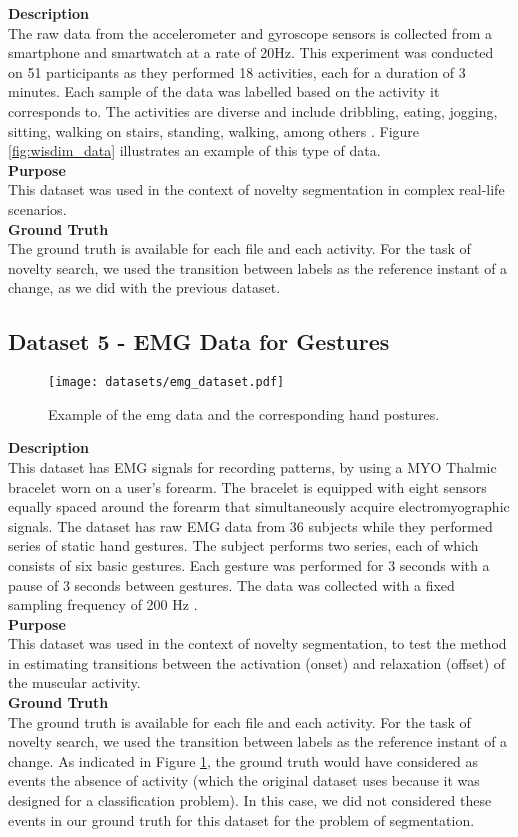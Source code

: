 \textbf{Description}\hfill\\
The raw data from the accelerometer and gyroscope sensors is collected from a smartphone and smartwatch at a rate of 20Hz. This experiment was conducted on 51 participants as they performed 18 activities, each for a duration of 3 minutes. Each sample of the data was labelled based on the activity it corresponds to. The activities are diverse and include dribbling, eating, jogging, sitting, walking on stairs, standing, walking, among others \cite{dataset4}. Figure \ref{fig:wisdim_data} illustrates an example of this type of data.\\
\textbf{Purpose}\hfill\\
This dataset was used in the context of novelty segmentation in complex real-life scenarios.\\
\textbf{Ground Truth}\\
The ground truth is available for each file and each activity. For the task of novelty search, we used the transition between labels as the reference instant of a change, as we did with the previous dataset.

\subsection{Dataset 5 - EMG Data for Gestures}
\label{dat:dataset6}

\begin{figure}
\centering
\texttt{[image: datasets/emg\_dataset.pdf]}
\caption{Example of the \gls{emg} data and the corresponding hand postures.}
\label{fig:emg_dataset}
\end{figure}

\textbf{Description}\hfill\\
This dataset has EMG signals for recording patterns, by using a MYO Thalmic bracelet worn on a user's forearm. The bracelet is equipped with eight sensors equally spaced around the forearm that simultaneously acquire electromyographic signals. The dataset has raw EMG data from 36 subjects while they performed series of static hand gestures. The subject performs two series, each of which consists of six basic gestures. Each gesture was performed for 3 seconds with a pause of 3 seconds between gestures. The data was collected with a fixed sampling frequency of 200 Hz \cite{dataset5}.\\
\textbf{Purpose}\hfill\\
This dataset was used in the context of novelty segmentation, to test the method in estimating transitions between the activation (onset) and relaxation (offset) of the muscular activity.\\
\textbf{Ground Truth}\\
The ground truth is available for each file and each activity. For the task of novelty search, we used the transition between labels as the reference instant of a change. As indicated in Figure \ref{fig:emg_dataset}, the ground truth would have considered as events the absence of activity (which the original dataset uses because it was designed for a classification problem). In this case, we did not considered these events in our ground truth for this dataset for the problem of segmentation.    

